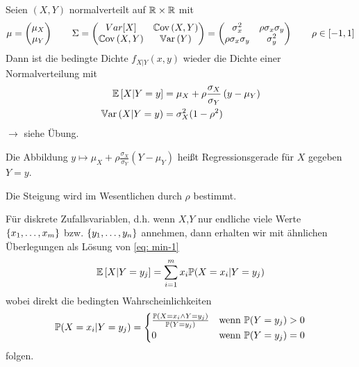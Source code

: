 \begin{*beispiel}
	Seien $(X,Y)$ normalverteilt auf $\R \times \R$ mit
	\begin{equation*}
	\mu = \begin{pmatrix} \mu_X \\ \mu_Y \end{pmatrix} \qquad \Sigma 
	= \begin{pmatrix} Var[X] & \Cov{X}{Y} \\ \Cov{X}{Y} & \Var[Y] \end{pmatrix}
	= \begin{pmatrix}
	\sigma_x^2 & \rho \sigma_x \sigma_y \\ \rho \sigma_x \sigma_y & \sigma_y^2
	\end{pmatrix}
	\qquad \rho \in [-1,1]
	\end{equation*}
	Dann ist die bedingte Dichte $f_{X|Y}(x,y)$ wieder die Dichte einer Normalverteilung mit
	\begin{equation*}
	\begin{aligned}
	\EW[X|Y=y] &= \mu_X + \rho \frac{\sigma_X}{\sigma_Y} \brackets{y - \mu_Y} \\
	\Var[X|Y=y] &= \sigma_X^2 (1-\rho^2)
	\end{aligned}
	\end{equation*}
	$\to$ siehe Übung.
	
	Die Abbildung $y \mapsto \mu_X + \rho \frac{\sigma_X}{\sigma_Y}(Y-\mu_Y)$ heißt Regressionsgerade für $X$ gegeben $Y = y$.
	
	
	Die Steigung wird im Wesentlichen durch $\rho$ bestimmt.
	
	Für diskrete Zufallsvariablen, d.h. wenn $X$,$Y$ nur endliche viele Werte $\menge{x_1, \dots , x_m}$ bzw. $\menge{y_1, \dots, y_n}$ annehmen, dann erhalten wir mit ähnlichen Überlegungen als Lösung von \eqref{eq: min-1} 
	\begin{equation*}
	\EW[X | Y=y_j] = \sum_{i=1}^m x_i \P(X=x_i | Y=y_j)
	\end{equation*}
	wobei direkt die bedingten Wahrscheinlichkeiten
	\begin{equation*}
	\P(X=x_i | Y=y_j) = \begin{cases}
	\frac{\P(X=x_i \land Y = y_j)}{\P(Y=y_j)} & \text{wenn } \P(Y = y_j) > 0 \\
	0 & \text{wenn } \P(Y=y_j) = 0
	\end{cases}
	\end{equation*}
	folgen.
\end{*beispiel}

